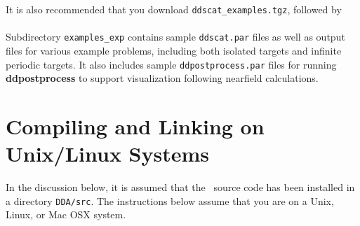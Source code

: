 It is also recommended that you download {\tt ddscat\subvers\_examples.tgz},
followed by\\
\indent{}\\
Subdirectory {\tt examples\_exp} contains sample {\tt ddscat.par} files
as well as output files for various example problems, including
both isolated targets and infinite periodic targets.
It also includes sample {\tt ddpostprocess.par} files for running 
{\bf ddpostprocess}
to support visualization following nearfield calculations.





\section{Compiling and Linking on Unix/Linux Systems\label{sec:compiling}}
In the discussion below, it is assumed that the
\ddscatv\ source code has been installed in a directory
{\tt DDA/src}.
The instructions below assume that you are on a Unix, Linux, or Mac OSX 
system.

